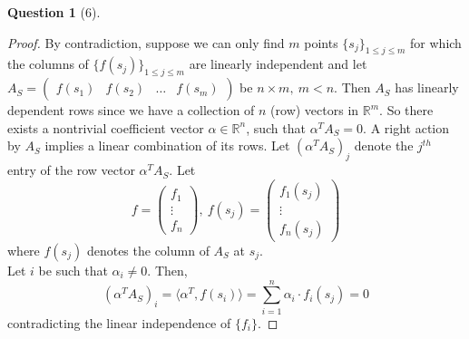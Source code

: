 \documentclass[11pt]{article}
\theoremstyle{quest}
\newtheorem*{question}{Question}
\begin{document}
\begin{question}[6]
\end{question}
\begin{proof}
By contradiction, suppose we can only find $m$ points $\{s_j\}_{1 \le j \le m}$ for which the columns of $\{f(s_j)\}_{1 \le j \le m}$ are linearly independent and let $A_S = \begin{pmatrix}
f(s_1) & f(s_2) & \ldots & f(s_m)
\end{pmatrix}$ be $n \times m,\ m < n$. Then $A_S$ has linearly dependent rows since we have a collection of $n$ (row) vectors in $\mathbb{R}^m$. So there exists a nontrivial coefficient vector $\alpha \in \mathbb{R}^n$, such that $\alpha^T A_S = 0$. A right action by $A_S$ implies a linear combination of its rows. Let $(\alpha^T A_S)_j$ denote the $j^{th}$ entry of the row vector $\alpha^T A_S$. Let 
$$f = \begin{pmatrix}
f_1 \\
\vdots \\
f_n
\end{pmatrix},\ f(s_j) = \begin{pmatrix}
f_1(s_j) \\
\vdots \\
f_n(s_j)
\end{pmatrix}$$
where $f(s_j)$ denotes the column of $A_S$ at $s_j$.
\\Let $i$ be such that $\alpha_i \ne 0$. Then,
$$(\alpha^T A_S)_i = \langle \alpha^T, f(s_i) \rangle = \sum_{i=1}^n \alpha_i \cdot f_i(s_j) = 0$$
contradicting the linear independence of $\{f_i\}$.
\end{proof}
\end{document}
